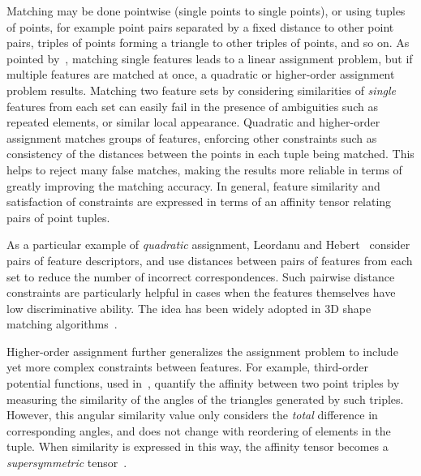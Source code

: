 Matching may be done pointwise (single points to single points), or using tuples of points,
for example point pairs separated by a fixed distance to other point pairs,
triples of points forming a triangle to other triples of points, and so on.
As pointed by~\cite{Conte04}, matching single features leads to
a linear assignment problem, but if multiple features are matched at once,
a quadratic or higher-order assignment problem results.
Matching two feature sets by considering similarities of \emph{single} features from each set can easily fail in the presence of ambiguities such as repeated elements,
or similar local appearance.
Quadratic and higher-order assignment matches groups of features,
enforcing other constraints such as consistency of the distances between the points in each tuple being matched.
This helps to reject many false matches, making the results more reliable in terms of greatly improving the matching accuracy.
In general, feature similarity and satisfaction of constraints are expressed in terms of an affinity tensor relating pairs of point tuples.

As a particular example of \emph{quadratic} assignment, Leordanu and Hebert~\cite{Leordeanu05} consider pairs of feature descriptors,
and use distances between pairs of features from each set to reduce the number of incorrect correspondences.
Such pairwise distance constraints are particularly helpful in cases when the features themselves have low discriminative ability.
The idea has been widely adopted in 3D shape matching algorithms~\cite{Tevs09,Ovsjanikov10,Tevs11,Kim11,SahilliogluY11,Windheuser11}.

Higher-order assignment further generalizes the assignment problem to include yet more complex constraints between features.
For example, third-order potential functions, used in~\cite{Duchenne09,Zeng10,Chertok10},
quantify the affinity between two point triples by measuring the similarity of the angles of the triangles generated by such triples.
However, this angular similarity value only considers the \emph{total} difference in corresponding angles, and does not change with reordering of elements in the tuple.
When similarity is expressed in this way, the affinity tensor becomes a \emph{supersymmetric} tensor~\cite{Kofidis02}.

